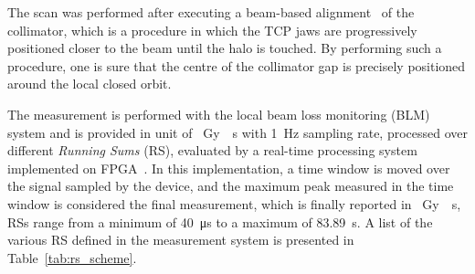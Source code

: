 The scan was performed after executing a beam-based alignment~\cite{valentino2012semiautomatic} of the collimator, which is a procedure in which the TCP jaws are progressively positioned closer to the beam until the halo is touched. By performing such a procedure, one is sure that the centre of the collimator gap is precisely positioned around the local closed orbit.

The measurement is performed with the local beam loss monitoring (BLM) system and is provided in unit of \SI{}{Gy \per s} with \SI{1}{Hz} sampling rate, processed over different \textit{Running Sums} (RS), evaluated by a real-time processing system implemented on FPGA~\cite{4179157}. In this implementation, a time window is moved over the signal sampled by the device, and the maximum peak measured in the time window is considered the final measurement, which is finally reported in \SI{}{Gy \per s}, RSs range from a minimum of \SI{40}{\micro s} to a maximum of \SI{83.89}{s}. A list of the various RS defined in the measurement system is presented in Table~\ref{tab:rs_scheme}.

